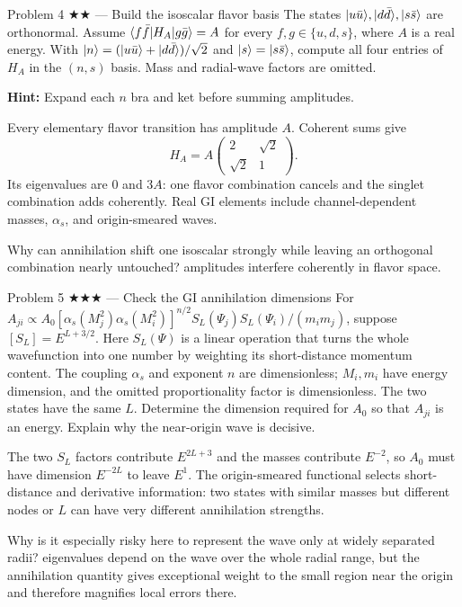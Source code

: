 \documentclass[11pt]{article}
\begin{document}
\begin{problem}{Problem 4 ★★ — Build the isoscalar flavor basis}
The states $\lvert u\bar u\rangle,\lvert d\bar d\rangle,\lvert s\bar s\rangle$ are orthonormal.
Assume $\langle f\bar f\rvert H_A\lvert g\bar g\rangle=A$ for every
$f,g\in\{u,d,s\}$, where $A$ is a real energy.
With $\lvert n\rangle=(\lvert u\bar u\rangle+\lvert d\bar d\rangle)/\sqrt2$ and
$\lvert s\rangle=\lvert s\bar s\rangle$, compute all four entries of $H_A$ in the $(n,s)$
basis. Mass and radial-wave factors are omitted.

\textbf{Hint:} Expand each $n$ bra and ket before summing amplitudes.
\end{problem}
\begin{solution}
Every elementary flavor transition has amplitude $A$. Coherent sums give
\[
H_A=A\begin{pmatrix}2&\sqrt2\\\sqrt2&1\end{pmatrix}.
\]
Its eigenvalues are $0$ and $3A$: one flavor combination cancels and the singlet
combination adds coherently. Real GI elements include channel-dependent masses,
$\alpha_s$, and origin-smeared waves.
\end{solution}
\begin{quiz}
Why can annihilation shift one isoscalar strongly while leaving an orthogonal
combination nearly untouched? \answer amplitudes interfere coherently in flavor
space.
\end{quiz}

\begin{problem}{Problem 5 ★★★ — Check the GI annihilation dimensions}
For
$A_{ji}\propto A_0[\alpha_s(M_j^2)\alpha_s(M_i^2)]^{n/2}
S_L(\Psi_j)S_L(\Psi_i)/(m_im_j)$, suppose
$[S_L]=E^{L+3/2}$. Here $S_L(\Psi)$ is a linear operation that turns the whole
wavefunction into one number by weighting its short-distance momentum content.
The coupling $\alpha_s$ and exponent $n$ are dimensionless;
$M_i,m_i$ have energy dimension, and the omitted proportionality factor
is dimensionless. The two states have the same $L$.
Determine the dimension required for $A_0$ so that
$A_{ji}$ is an energy. Explain why the near-origin wave is decisive.
\end{problem}
\begin{solution}
The two $S_L$ factors contribute $E^{2L+3}$ and the masses contribute $E^{-2}$,
so $A_0$ must have dimension $E^{-2L}$ to leave $E^1$. The origin-smeared
functional selects short-distance and derivative information: two states with
similar masses but different nodes or $L$ can have very different annihilation
strengths.
\end{solution}
\begin{quiz}
Why is it especially risky here to represent the wave only at widely separated
radii? \answer eigenvalues depend on the wave over the whole radial range, but
the annihilation quantity gives exceptional weight to the small region near the
origin and therefore magnifies local errors there.
\end{quiz}
\end{document}
